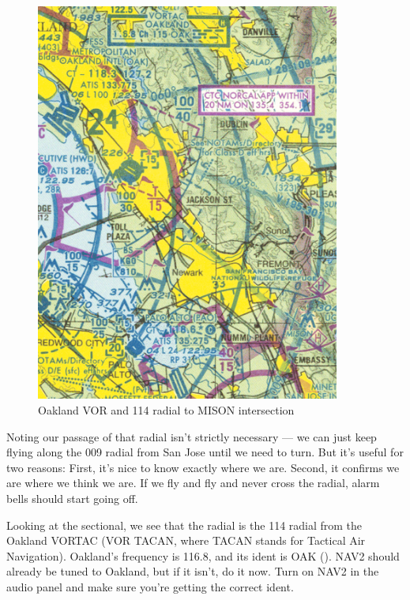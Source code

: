 \begin{figure}
  \begin{center}
    \includegraphics[width=10cm]{img/Oakland}
    \caption{Oakland VOR and 114 radial to MISON intersection}
    \label{fig:Oakland}
  \end{center}
\end{figure}

Noting our passage of that radial isn't strictly necessary --- we can
just keep flying along the 009 radial from San Jose until we need to
turn.  But it's useful for two reasons: First, it's nice to know
exactly where we are.  Second, it confirms we are where we think we
are.  If we fly and fly and never cross the radial, alarm bells should
start going off.


Looking at the sectional, we see that the radial is the 114 radial
from the Oakland VORTAC (VOR TACAN, where TACAN stands for Tactical
Air Navigation).  Oakland's frequency is 116.8, and its ident is OAK
(\mdash\mdash\mdash\mspace \mdot\mdash\mspace \mdash\mdot\mdash).
NAV2 should already be tuned to Oakland, but if it isn't, do it
now. Turn on NAV2 in the
audio panel and make sure you're getting the correct ident.


